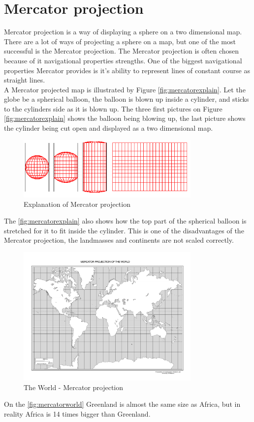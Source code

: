 \section{Mercator projection}
\label{sec:mercatorprojection}
Mercator projection is a way of displaying a sphere on a two dimensional map.
There are a lot of ways of projecting a sphere on a map, but one of the most successful is the Mercator projection. The Mercator projection is often chosen because of it navigational properties strengths. One of the biggest navigational properties Mercator provides is it's ability to represent lines of constant course as straight lines.\\
A Mercator projected map is illustrated by Figure  \autoref{fig:mercatorexplain}. Let the globe be a spherical balloon, the balloon is blown up inside a cylinder, and sticks to the cylinders side as it is blown up. The three first pictures on Figure \autoref{fig:mercatorexplain} shows the balloon being blowing up, the last picture shows the cylinder being cut open and displayed as a two dimensional map.
\begin{figure}[H]
\centering
\includegraphics[width=0.8\textwidth]{img/mercatorexplain.png}
\caption{Explanation of Mercator projection \citep{mercatorexplain}}
\label{fig:mercatorexplain}
\end{figure}
The \autoref{fig:mercatorexplain} also shows how the top part of the spherical balloon is stretched for it to fit inside the cylinder. This is one of the disadvantages of the Mercator projection, the landmasses and continents are not scaled correctly.
\begin{figure}[H]
\centering
\includegraphics[width=0.8\textwidth]{img/mercatorworld.pdf}
\caption{The World - Mercator projection  \citep{mercatorworld}}
\label{fig:mercatorworld}
\end{figure} 
On the \autoref{fig:mercatorworld} Greenland is almost the same size as Africa, but in reality Africa is 14 times bigger than Greenland.

